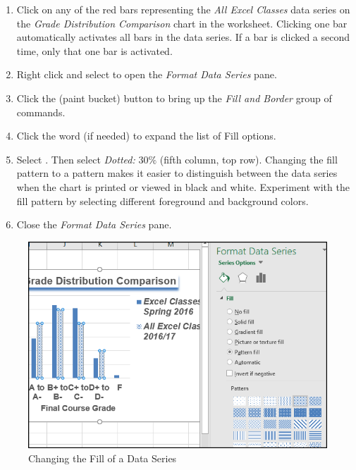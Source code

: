\begin{enumbox}
	\begin{enumerate}
		\item Click on any of the red bars representing the \textit{All Excel Classes} data series on the \textit{Grade Distribution Comparison} chart in the  worksheet. Clicking one bar automatically activates all bars in the data series. If a bar is clicked a second time, only that one bar is activated.
		\item Right click and select  to open the \textit{Format Data Series} pane.
		\item Click the  (paint bucket) button to bring up the \textit{Fill and Border} group of commands.
		\item Click the word  (if needed) to expand the list of Fill options.
		\item Select . Then select \textit{Dotted: }$ 30\% $ (fifth column, top row). Changing the fill pattern to a pattern makes it easier to distinguish between the data series when the chart is printed or viewed in black and white. Experiment with the fill pattern by selecting different foreground and background colors.
		\item Close the \textit{Format Data Series} pane.
	\end{enumerate}
\end{enumbox}
	
\begin{figure}[H]
	\centering
	\includegraphics[width=\maxwidth{.95\linewidth}]{gfx/ch04_fig37}
	\caption{Changing the Fill of a Data Series}
	\label{04:fig37}
\end{figure}

